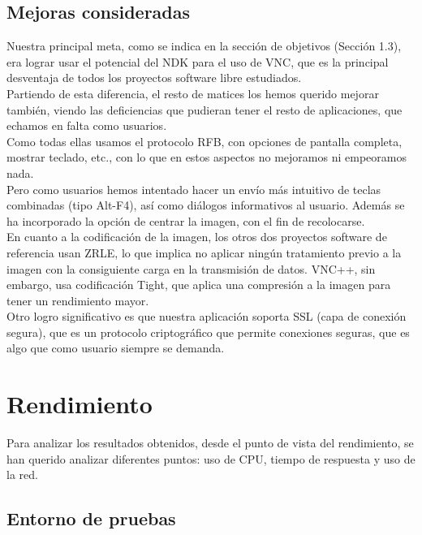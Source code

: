 \subsection{Mejoras consideradas}

Nuestra principal meta, como se indica en la sección de objetivos (Sección 1.3), era lograr usar el potencial del NDK para el uso de VNC, que es la principal desventaja de todos los proyectos software libre estudiados.\\

Partiendo de esta diferencia, el resto de matices los hemos querido mejorar también, viendo las deficiencias que pudieran tener el resto de aplicaciones, que echamos en falta como usuarios.\\

Como todas ellas usamos el protocolo RFB, con opciones de pantalla completa, mostrar teclado, etc., con lo que en estos aspectos no mejoramos ni empeoramos nada.\\

Pero como usuarios hemos intentado hacer un envío más intuitivo de teclas combinadas (tipo Alt-F4), así como diálogos informativos al usuario. Además se ha incorporado la opción de centrar la imagen, con el fin de recolocarse.\\

En cuanto a la codificación de la imagen, los otros dos proyectos software de referencia usan ZRLE, lo que implica no aplicar ningún tratamiento previo a la imagen con la consiguiente carga en la transmisión de datos. VNC++, sin embargo, usa codificación Tight, que aplica una compresión a la imagen para tener un rendimiento mayor.\\

Otro logro significativo es que nuestra aplicación soporta SSL (capa de conexión segura), que es un protocolo criptográfico que permite conexiones seguras, que es algo que como usuario siempre se demanda.
\section{Rendimiento}

Para analizar los resultados obtenidos, desde el punto de vista del rendimiento, se han querido analizar diferentes puntos: uso de CPU, tiempo de respuesta y uso de la red.

\subsection{Entorno de pruebas}

